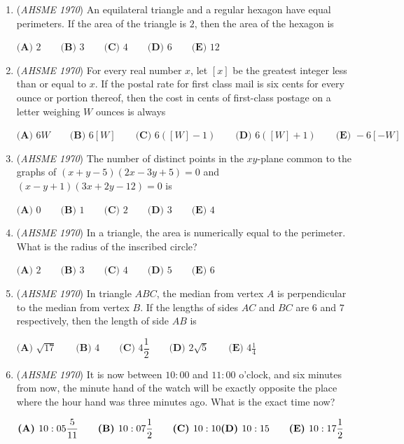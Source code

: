 \begin{enumerate}
	\item (\textit{AHSME 1970}) An equilateral triangle and a regular hexagon have equal perimeters. If the area of the triangle is $2$, then the area of the hexagon is


 $\textbf{(A) }2\qquad \textbf{(B) }3\qquad \textbf{(C) }4\qquad \textbf{(D) }6\qquad  \textbf{(E) }12$


	\item (\textit{AHSME 1970}) For every real number $x$, let $[x]$ be the greatest integer less than or equal to $x$. 
If the postal rate for first class mail is six cents for every ounce or portion thereof, 
then the cost in cents of first-class postage on a letter weighing $W$ ounces is always


 $\textbf{(A) }6W\qquad \textbf{(B) }6[W]\qquad \textbf{(C) }6([W]-1)\qquad \textbf{(D) }6([W]+1)\qquad  \textbf{(E) }-6[-W]$


	\item (\textit{AHSME 1970}) The number of distinct points in the $xy$-plane common to the graphs of $(x+y-5)(2x-3y+5)=0$ and $(x-y+1)(3x+2y-12)=0$ is


 $\textbf{(A) }0\qquad \textbf{(B) }1\qquad \textbf{(C) }2\qquad \textbf{(D) }3\qquad  \textbf{(E) }4$


	\item (\textit{AHSME 1970}) In a triangle, the area is numerically equal to the perimeter. What is the radius of the inscribed circle?


 $\textbf{(A) }2\qquad \textbf{(B) }3\qquad \textbf{(C) }4\qquad \textbf{(D) }5\qquad  \textbf{(E) }6$


	\item (\textit{AHSME 1970}) In triangle $ABC$, the median from vertex $A$ is perpendicular to the median from vertex $B$. 
If the lengths of sides $AC$ and $BC$ are $6$ and $7$ respectively, then the length of side $AB$ is


 $\textbf{(A) }\sqrt{17}\qquad \textbf{(B) }4\qquad \textbf{(C) }4\dfrac{1}{2}\qquad \textbf{(D) }2\sqrt{5}\qquad \textbf{(E) }4\frac{1}{4}$


	\item (\textit{AHSME 1970}) It is now between $10:00$ and $11:00$ o'clock, and six minutes from now, the minute hand of the 
watch will be exactly opposite the place where the hour hand was three minutes ago. What is the exact time now?


 $\textbf{(A) }10:05\dfrac{5}{11}\qquad \textbf{(B) }10:07\dfrac{1}{2}\qquad \textbf{(C) }10:10\qquad\\ \textbf{(D) }10:15\qquad \textbf{(E) }10:17\dfrac{1}{2}$



\end{enumerate}
